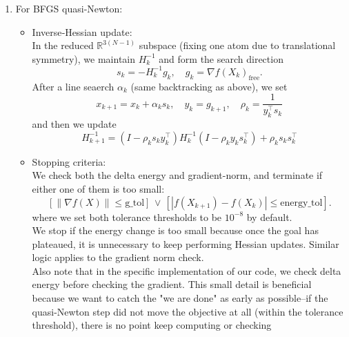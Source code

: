 \documentclass[11pt,onecolumn]{article}
\newcommand{\R}{\mathbb{R}}
\begin{document}
\begin{enumerate}
    \item 
    For BFGS quasi‑Newton:
    \begin{itemize}
        \item 
        Inverse‐Hessian update:\\
        In the reduced $\R^{3(N-1)}$ subspace (fixing one atom due to translational symmetry), we maintain $H_k^{-1}$ and form the search direction
        $$
        s_k = -H^{-1}_k g_k, \quad g_k = \nabla f(X_k)_{\text{free}}.
        $$
        After a line seaerch $\alpha_k$ (same backtracking as above), we set
        $$
        x_{k+1} = x_k+ \alpha_k s_k, \quad
        y_k = g_{k+1}, \quad
        \rho_k = \frac{1}{y_k^\top s_k}
        $$
        and then we update
        $$
        H_{k+1}^{-1}=(I-\rho_k s_k y_k^\top)H_k^{-1} (I-\rho_k y_k s_k^\top)+\rho_k s_k s_k^\top
        $$
        \item 
        Stopping criteria:\\
        We check both the delta energy and gradient-norm, and terminate if either one of them is too small:
        $$
        \left[ \| \nabla f(X) \| \leq \text{g\_tol} \right] \, \vee \, \left[|f(X_{k+1}) - f(X_k)| \leq \text{energy\_tol}\right].
        $$
        where we set both tolerance thresholds to be $10^{-8}$ by default.\\
        We stop if the energy change is too small because once the goal has plateaued, it is unnecessary to keep performing Hessian updates. Similar logic applies to the gradient norm check.\\
        Also note that in the specific implementation of our code, we check delta energy before checking the gradient. This small detail is beneficial because we want to catch the "we are done" as early as possible--if the quasi-Newton step did not move the objective at all (within the tolerance threshold), there is no point keep computing or checking 
    \end{itemize}


    
\end{enumerate}
\end{document}
